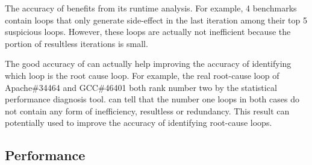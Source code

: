 The accuracy of \Tool benefits from its runtime analysis.
For example, 4 benchmarks contain loops that only generate side-effect
in the last iteration among their top 5 suspicious loops. However,
these loops are actually not inefficient because the portion of
resultless iterations is small. 

The good accuracy of \Tool can actually help improving the accuracy of
identifying which loop is the root cause loop.
For example, the real root-cause loop of Apache\#34464 and GCC\#46401 both
rank number two by the statistical performance diagnosis tool.
\Tool can tell that the number one loops in both cases do not contain
any form of inefficiency, resultless or redundancy. This result can
potentially used to improve the accuracy of identifying root-cause loops.


\subsection{Performance}
\label{sec:6_result_perf}


